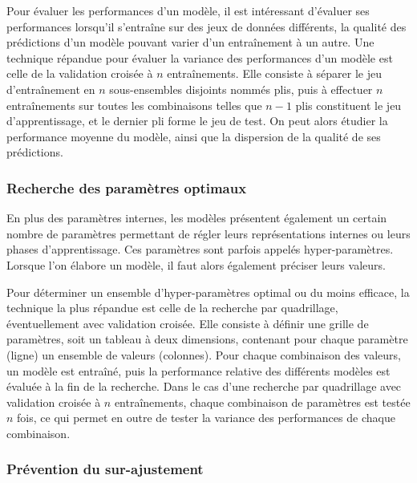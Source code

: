 \label{apprentissage_automatique_validation_croisée}

\par Pour évaluer les performances d'un modèle, il est intéressant d'évaluer ses performances lorsqu'il s'entraîne sur des jeux de données différents, la qualité des prédictions d'un modèle pouvant varier d'un entraînement à un autre. Une technique répandue pour évaluer la variance des performances d'un modèle est celle de la validation croisée à $n$ entraînements. Elle consiste à séparer le jeu d'entraînement en $n$ sous-ensembles disjoints nommés plis, puis à effectuer $n$ entraînements sur toutes les combinaisons telles que $n-1$ plis constituent le jeu d'apprentissage, et le dernier pli forme le jeu de test. On peut alors étudier la performance moyenne du modèle, ainsi que la dispersion de la qualité de ses prédictions.


\subsubsection{Recherche des paramètres optimaux}

\label{apprentissage_automatique_quadri}
\par En plus des paramètres internes, les modèles présentent également un certain nombre de paramètres permettant de régler leurs représentations internes ou leurs phases d'apprentissage. Ces paramètres sont parfois appelés hyper-paramètres. Lorsque l'on élabore un modèle, il faut alors également préciser leurs valeurs.\\
\par Pour déterminer un ensemble d'hyper-paramètres optimal ou du moins efficace, la technique la plus répandue est celle de la recherche par quadrillage, éventuellement avec validation croisée. Elle consiste à définir une grille de paramètres, soit un tableau à deux dimensions, contenant pour chaque paramètre (ligne) un ensemble de valeurs (colonnes). Pour chaque combinaison des valeurs, un modèle est entraîné, puis la performance relative des différents modèles est évaluée à la fin de la recherche. Dans le cas d'une recherche par quadrillage avec validation croisée à $n$ entraînements, chaque combinaison de paramètres est testée $n$ fois, ce qui permet en outre de tester la variance des performances de chaque combinaison.

\subsubsection{Prévention du sur-ajustement}
\label{sur_ajustement}

